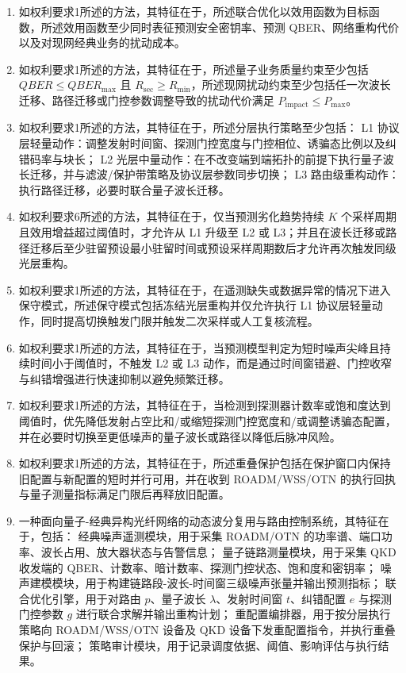 \documentclass[12pt,a4paper]{article}
\begin{document}
\begin{enumerate}[
    label=\arabic*.,
    leftmargin=0pt,
    itemindent=2em,
    labelsep=0.5em,
    align=left,
    itemsep=0.6em,
    topsep=0pt
]
\item 如权利要求1所述的方法，其特征在于，所述联合优化以效用函数为目标函数，所述效用函数至少同时表征预测安全密钥率、预测 QBER、网络重构代价以及对现网经典业务的扰动成本。

\item 如权利要求1所述的方法，其特征在于，所述量子业务质量约束至少包括 $QBER \leq QBER_{\max}$ 且 $R_{\mathrm{sec}} \geq R_{\min}$，所述现网扰动约束至少包括任一次波长迁移、路径迁移或门控参数调整导致的扰动代价满足 $P_{\mathrm{impact}} \leq P_{\max}$。

\item 如权利要求1所述的方法，其特征在于，所述分层执行策略至少包括：
L1 协议层轻量动作：调整发射时间窗、探测门控宽度与门控相位、诱骗态比例以及纠错码率与块长；
L2 光层中量动作：在不改变端到端拓扑的前提下执行量子波长迁移，并与滤波/保护带策略及协议层参数同步切换；
L3 路由级重构动作：执行路径迁移，必要时联合量子波长迁移。

\item 如权利要求6所述的方法，其特征在于，仅当预测劣化趋势持续 $K$ 个采样周期且效用增益超过阈值时，才允许从 L1 升级至 L2 或 L3；并且在波长迁移或路径迁移后至少驻留预设最小驻留时间或预设采样周期数后才允许再次触发同级光层重构。

\item 如权利要求1所述的方法，其特征在于，在遥测缺失或数据异常的情况下进入保守模式，所述保守模式包括冻结光层重构并仅允许执行 L1 协议层轻量动作，同时提高切换触发门限并触发二次采样或人工复核流程。

\item 如权利要求1所述的方法，其特征在于，当预测模型判定为短时噪声尖峰且持续时间小于阈值时，不触发 L2 或 L3 动作，而是通过时间窗错避、门控收窄与纠错增强进行快速抑制以避免频繁迁移。

\item 如权利要求1所述的方法，其特征在于，当检测到探测器计数率或饱和度达到阈值时，优先降低发射占空比和/或缩短探测门控宽度和/或调整诱骗态配置，并在必要时切换至更低噪声的量子波长或路径以降低后脉冲风险。

\item 如权利要求1所述的方法，其特征在于，所述重叠保护包括在保护窗口内保持旧配置与新配置的短时并行可用，并在收到 ROADM/WSS/OTN 的执行回执与量子测量指标满足门限后再释放旧配置。

\item 一种面向量子-经典异构光纤网络的动态波分复用与路由控制系统，其特征在于，包括：
经典噪声遥测模块，用于采集 ROADM/OTN 的功率谱、端口功率、波长占用、放大器状态与告警信息；
量子链路测量模块，用于采集 QKD 收发端的 QBER、计数率、暗计数率、探测门控状态、饱和度和密钥率；
噪声建模模块，用于构建链路段-波长-时间窗三级噪声张量并输出预测指标；
联合优化引擎，用于对路由 $p$、量子波长 $\lambda$、发射时间窗 $t$、纠错配置 $e$ 与探测门控参数 $g$ 进行联合求解并输出重构计划；
重配置编排器，用于按分层执行策略向 ROADM/WSS/OTN 设备及 QKD 设备下发重配置指令，并执行重叠保护与回滚；
策略审计模块，用于记录调度依据、阈值、影响评估与执行结果。


\end{enumerate}
\end{document}
